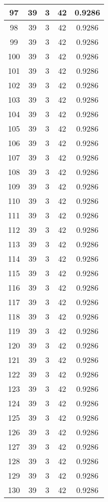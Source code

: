 \documentclass[letterpaper, 12pt]{article}
\begin{document}
\begin{longtable}{|c|c|c|c|c|}
\hline
97 & 39 & 3 & 42 & 0.9286 \\
\hline
98 & 39 & 3 & 42 & 0.9286 \\
\hline
99 & 39 & 3 & 42 & 0.9286 \\
\hline
100 & 39 & 3 & 42 & 0.9286 \\
\hline
101 & 39 & 3 & 42 & 0.9286 \\
\hline
102 & 39 & 3 & 42 & 0.9286 \\
\hline
103 & 39 & 3 & 42 & 0.9286 \\
\hline
104 & 39 & 3 & 42 & 0.9286 \\
\hline
105 & 39 & 3 & 42 & 0.9286 \\
\hline
106 & 39 & 3 & 42 & 0.9286 \\
\hline
107 & 39 & 3 & 42 & 0.9286 \\
\hline
108 & 39 & 3 & 42 & 0.9286 \\
\hline
109 & 39 & 3 & 42 & 0.9286 \\
\hline
110 & 39 & 3 & 42 & 0.9286 \\
\hline
111 & 39 & 3 & 42 & 0.9286 \\
\hline
112 & 39 & 3 & 42 & 0.9286 \\
\hline
113 & 39 & 3 & 42 & 0.9286 \\
\hline
114 & 39 & 3 & 42 & 0.9286 \\
\hline
115 & 39 & 3 & 42 & 0.9286 \\
\hline
116 & 39 & 3 & 42 & 0.9286 \\
\hline
117 & 39 & 3 & 42 & 0.9286 \\
\hline
118 & 39 & 3 & 42 & 0.9286 \\
\hline
119 & 39 & 3 & 42 & 0.9286 \\
\hline
120 & 39 & 3 & 42 & 0.9286 \\
\hline
121 & 39 & 3 & 42 & 0.9286 \\
\hline
122 & 39 & 3 & 42 & 0.9286 \\
\hline
123 & 39 & 3 & 42 & 0.9286 \\
\hline
124 & 39 & 3 & 42 & 0.9286 \\
\hline
125 & 39 & 3 & 42 & 0.9286 \\
\hline
126 & 39 & 3 & 42 & 0.9286 \\
\hline
127 & 39 & 3 & 42 & 0.9286 \\
\hline
128 & 39 & 3 & 42 & 0.9286 \\
\hline
129 & 39 & 3 & 42 & 0.9286 \\
\hline
130 & 39 & 3 & 42 & 0.9286 \\

\end{longtable}
\end{document}
